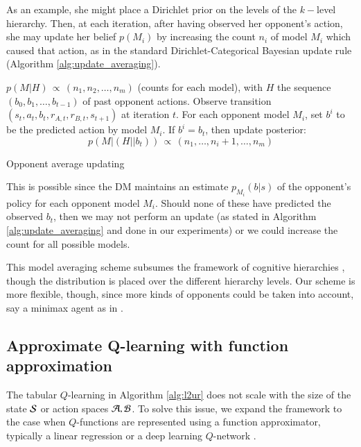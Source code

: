 As an example, she might place a Dirichlet prior on the levels of the $k-$level hierarchy. Then,
at each iteration, after having observed her opponent's action, she may
update her belief $p(M_i)$ by increasing the count $n_i$ of model $M_i$ which
caused that action, as in the standard Dirichlet-Categorical Bayesian
update rule (Algorithm \ref{alg:update_averaging}). 
\begin{algorithm*}[!ht]
\begin{algorithmic}[1]
\Require $p(M | H)\, \propto\, (n_1, n_2, \ldots, n_m)$ (counts for each model), with 
$H$ the sequence $(b_0, b_1, \ldots, b_{t-1})$ of past opponent actions.
\State Observe  transition $(s_{t}, a_t, b_t, r_{A,t}, r_{B,t}, s_{t+1})$ at iteration $t$. %
\State For each opponent model $M_i$, set  $b^i$ to be the predicted action by model $M_i$.
\State If $b^i = b_t$, then update posterior:
$$
p(M | (H || b_t) ) \, \propto\,  (n_1, \ldots, n_i + 1, \ldots, n_m) 
$$
\end{algorithmic}
\caption{Opponent average updating}
\label{alg:update_averaging}
\end{algorithm*}
\noindent This is possible since 
the DM maintains an estimate $p_{M_i}(b|s)$ of the opponent's policy for each
opponent model $M_i$. Should none of these have 
predicted the observed $b_t$, then we may not perform an 
update (as stated in Algorithm \ref{alg:update_averaging} and done
in our experiments) or we could increase the count for all possible models.

This model averaging scheme subsumes the framework of cognitive hierarchies \parencite{camerer2004cognitive}, though the distribution is placed over the different hierarchy levels. Our scheme is more flexible,
though, since more kinds of opponents could be taken into account, 
say a minimax agent as 
in \textcite{rios1}.


\subsection{Approximate Q-learning with function approximation}\label{sec:approx_rl}

The tabular $Q$-learning in Algorithm \ref{alg:l2ur} does not scale with the size of the state ${\cal S}$ or action spaces
${\cal A, B}$.
To solve this issue, we expand the framework to the case when  $Q$-functions are represented using a function approximator, typically a linear regression or
a deep learning $Q$-network \parencite{mnih2015human}. 

